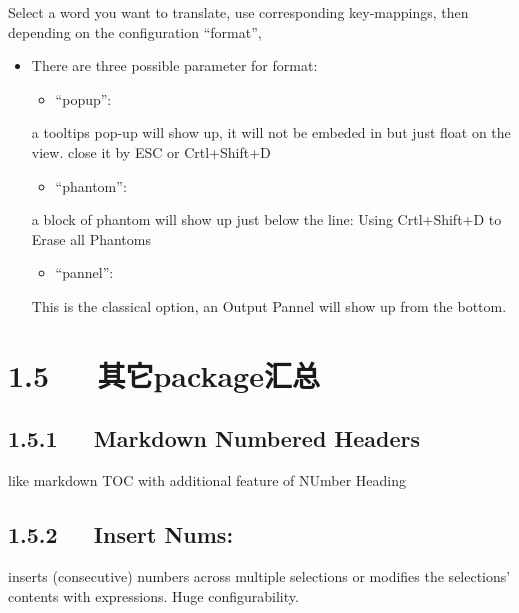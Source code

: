 \documentclass[letterpaper,12pt,english]{sphinxmanual}
\begin{document}
Select a word you want to translate, use corresponding key-mappings,
then depending on the configuration “format”,
\begin{itemize}
\item {} 
There are three possible parameter for format:
\begin{itemize}
\item {} 
“popup”:

\end{itemize}

a tooltips pop-up will show up, it will not be embeded in but just
float on the view. close it by ESC or Crtl+Shift+D
\begin{itemize}
\item {} 
“phantom”:

\end{itemize}

a block of phantom will show up just below the line: Using
Crtl+Shift+D to Erase all Phantoms
\begin{itemize}
\item {} 
“pannel”:

\end{itemize}

This is the classical option, an Output Pannel will show up from the
bottom.

\end{itemize}


\section{1.5   其它package汇总}
\label{\detokenize{001software/001install/sublime:package}}

\subsection{1.5.1   Markdown Numbered Headers}
\label{\detokenize{001software/001install/sublime:markdown-numbered-headers}}
like markdown TOC with additional feature of NUmber Heading


\subsection{1.5.2   Insert Nums:}
\label{\detokenize{001software/001install/sublime:insert-nums}}

inserts (consecutive) numbers across multiple selections or modifies the
selections’ contents with expressions. Huge configurability.
\end{document}
